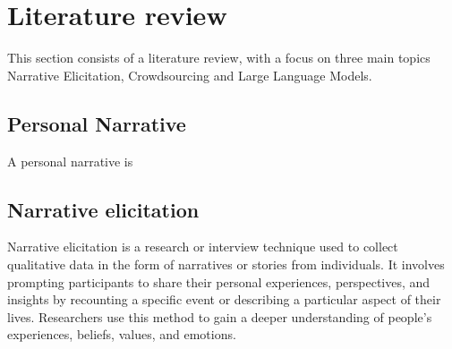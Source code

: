 \chapter{Literature review}
\label{cha:literature_review}
This section consists of a literature review, with a focus on three main topics Narrative Elicitation, Crowdsourcing and Large Language Models.
\section{Personal Narrative}
A personal narrative is \cite{}
\section{Narrative elicitation}
Narrative elicitation is a research or interview technique used to collect qualitative data in the form of narratives or stories from individuals. It involves prompting participants to share their personal experiences, perspectives, and insights by recounting a specific event or describing a particular aspect of their lives. Researchers use this method to gain a deeper understanding of people's experiences, beliefs, values, and emotions.


